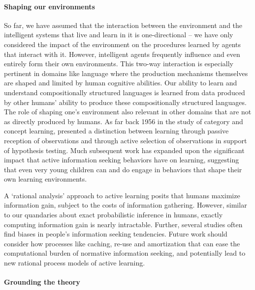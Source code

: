 \paragraph{Shaping our environments}

So far, we have assumed that the interaction between the environment and the intelligent systems that live and learn in it is one-directional -- we have only considered the impact of the environment on the procedures learned by agents that interact with it. However, intelligent agents frequently influence and even entirely form their own environments. This two-way interaction is especially pertinent in domains like language where the production mechanisms themselves are shaped and limited by human cognitive abilities. Our ability to learn and understand compositionally structured languages is learned from data produced by other humans' ability to produce these compositionally structured languages. The role of shaping one's environment also relevant in other domains that are not as directly produced by humans. As far back 1956 in the study of category and concept learning, \citet{bruner2017study} presented a distinction between learning through passive reception of observations and through active selection of observations in support of hypothesis testing. Much subsequent work has expanded upon the significant impact that active information seeking behaviors have on learning\citep{nelson2005finding,markant2014better, gureckis2012self}, suggesting that even very young children can and do engage in behaviors that shape their own learning environments\citep{ruggeri2017toma, gopnik1996scientist, montessori1912montessori}. 

A `rational analysis' approach to active learning posits that humans maximize information gain, subject to the costs of information gathering. However, similar to our quandaries about exact probabilistic inference in humans, exactly computing information gain is nearly intractable. Further, several studies often find biases in people's information seeking tendencies\citep{jonas2001confirmation, beattie1988confirmation}. Future work should consider how processes like caching, re-use and amortization that can ease the computational burden of normative information seeking, and potentially lead to new rational process models of active learning.


\paragraph{Grounding the theory}


